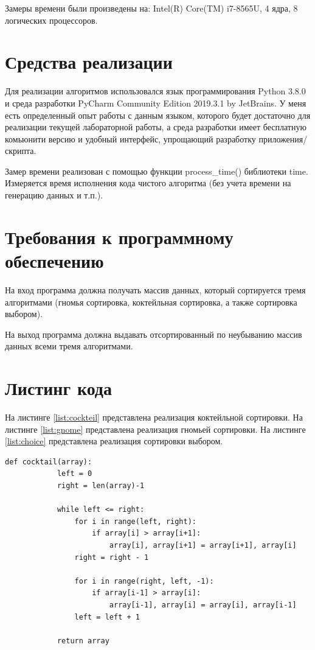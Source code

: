 \documentclass[a4paper,12pt]{report}
\begin{document}
        	Замеры времени были произведены на: Intel(R) Core(TM) i7-8565U, 4 ядра, 8 логических процессоров.

	\section{Средства реализации}

        	Для реализации алгоритмов использовался язык программирования Python 3.8.0 и среда разработки PyCharm Community Edition 2019.3.1 by JetBrains. 
        	У меня есть определенный опыт работы с данным языком, которого будет достаточно для реализации текущей лабораторной работы, а среда разработки имеет бесплатную комьюнити версию и удобный интерфейс, упрощающий разработку приложения/скрипта.
        	
        	Замер времени реализован с помощью функции process\_time() библиотеки time.
        	Измеряется время исполнения кода чистого алгоритма (без учета времени на генерацию данных и т.п.).\\
		
	\section{Требования к программному обеспечению}

			На вход программа должна получать массив данных, который сортируется тремя алгоритмами (гномья сортировка, коктейльная сортировка, а также сортировка выбором). 
			
			На выход программа должна выдавать отсортированный по неубыванию массив данных всеми тремя алгоритмами.
			
	\section{Листинг кода}

        	На листинге \ref{list:cockteil} представлена реализация коктейльной сортировки.
        	На листинге \ref{list:gnome} представлена реализация гномьей сортировки.
        	На листинге \ref{list:choice} представлена реализация сортировки выбором.
        	
	        \begin{lstlisting}[frame = single, breaklines, caption = Коктейльная сортировка, label=list:cockteil]
		def cocktail(array):
			left = 0
			right = len(array)-1
			
			while left <= right:
				for i in range(left, right):
					if array[i] > array[i+1]:
						array[i], array[i+1] = array[i+1], array[i]
				right = right - 1
			
				for i in range(right, left, -1):
					if array[i-1] > array[i]:
						array[i-1], array[i] = array[i], array[i-1]
				left = left + 1
			
			return array
	        \end{lstlisting}
	        
\end{document}
